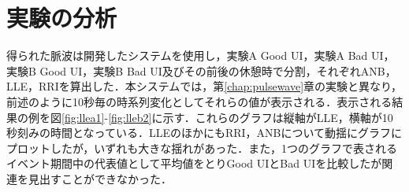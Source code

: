 \section{実験の分析}

得られた脈波は開発したシステムを使用し，実験A Good UI，実験A Bad UI，実験B Good UI，実験B Bad UI及びその前後の休憩時で分割，それぞれANB，LLE，RRIを算出した．本システムでは，第\ref{chap:pulsewave}章の実験と異なり，前述のように10秒毎の時系列変化としてそれらの値が表示される．表示される結果の例を図\ref{fig:llea1}-\ref{fig:lleb2}に示す．これらのグラフは縦軸がLLE，横軸が10秒刻みの時間となっている．LLEのほかにもRRI，ANBについて動揺にグラフにプロットしたが，いずれも大きな揺れがあった．また，1つのグラフで表されるイベント期間中の代表値として平均値をとりGood UIとBad UIを比較したが関連を見出すことができなかった．

